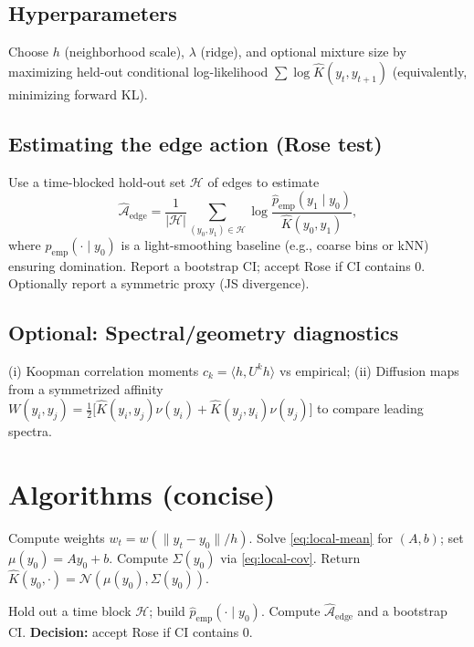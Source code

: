 \documentclass[11pt]{article}
\newcommand{\Khat}{\widehat{K}}
\begin{document}
\subsection{Hyperparameters}
\label{subsec:hyper}
Choose $h$ (neighborhood scale), $\lambda$ (ridge), and optional mixture size by maximizing held-out conditional log-likelihood
$\sum \log \Khat(y_t,y_{t+1})$ (equivalently, minimizing forward KL).

\subsection{Estimating the edge action (Rose test)}
\label{subsec:rose}
Use a time-blocked hold-out set $\mathcal{H}$ of edges to estimate
\begin{equation}
\widehat{\mathcal{A}}_{\text{edge}}
=
\frac{1}{|\mathcal{H}|}
\sum_{(y_0,y_1)\in\mathcal{H}}
\log\frac{\hat p_{\text{emp}}(y_1\mid y_0)}{\Khat(y_0,y_1)},
\end{equation}
where $\hat p_{\text{emp}}(\cdot\mid y_0)$ is a light-smoothing baseline (e.g., coarse bins or kNN) ensuring domination. Report a bootstrap CI; accept Rose if CI contains $0$. Optionally report a symmetric proxy (JS divergence).

\subsection{Optional: Spectral/geometry diagnostics}
\label{subsec:spectral}
(i) Koopman correlation moments $c_k=\langle h, U^k h\rangle$ vs empirical; 
(ii) Diffusion maps from a symmetrized affinity
$W(y_i,y_j)=\tfrac12\big[\Khat(y_i,y_j)\nu(y_i)+\Khat(y_j,y_i)\nu(y_j)\big]$
to compare leading spectra.

\section{Algorithms (concise)}
\label{sec:algs}

\begin{algorithm}[H]
\DontPrintSemicolon
\SetAlgoLined
\caption{FitLocalDiffusionKernel($y_0$, data, $h$, $\lambda$)}
Compute weights $w_t=w(\|y_t-y_0\|/h)$.\;
Solve \eqref{eq:local-mean} for $(A,b)$; set $\mu(y_0)=A y_0+b$.\;
Compute $\Sigma(y_0)$ via \eqref{eq:local-cov}.\;
Return $\Khat(y_0,\cdot)=\mathcal{N}(\mu(y_0),\Sigma(y_0))$.\;
\end{algorithm}

\begin{algorithm}[H]
\DontPrintSemicolon
\SetAlgoLined
\caption{RoseTest(data, $\Khat$)}
Hold out a time block $\mathcal{H}$; build $\hat p_{\text{emp}}(\cdot\mid y_0)$.\;
Compute $\widehat{\mathcal{A}}_{\text{edge}}$ and a bootstrap CI.\;
\textbf{Decision:} accept Rose if CI contains $0$.\;
\end{algorithm}
\end{document}

